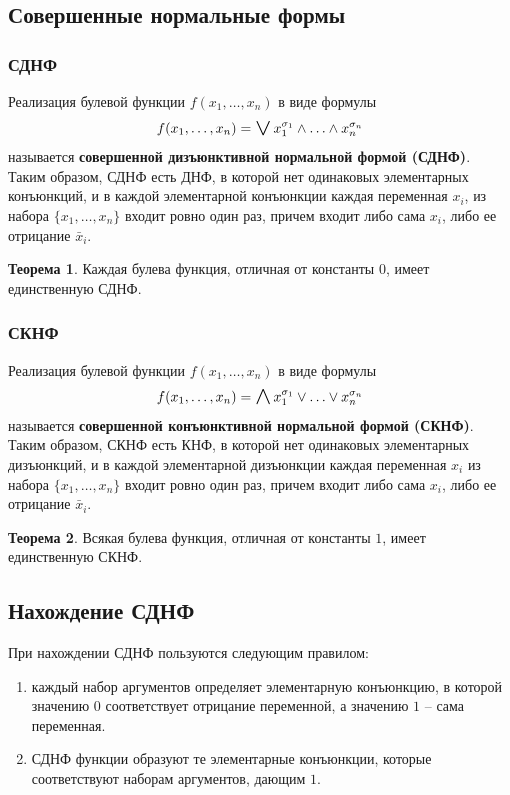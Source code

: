 \documentclass[a5paper, 11pt]{extarticle}
\theoremstyle{definition}
\newtheorem*{theorem*}{Теорема}
\theoremstyle{definition}
\theoremstyle{definition}
\numberwithin{figure}{section}
\numberwithin{table}{section}
\DeclareMathOperator{\biglor}{\mathrel{\raisebox{-.4ex}{$\mathlarger{\mathlarger{\mathlarger{\mathlarger{\lor}}}}$}}}
\DeclareMathOperator{\bigland}{\mathrel{\raisebox{-.4ex}{$\mathlarger{\mathlarger{\mathlarger{\mathlarger{\land}}}}$}}}
\begin{document}
\subsection{Совершенные нормальные формы}

\subsubsection{СДНФ}

Реализация булевой функции \(f(x_1, \ldots, x_n)\) в виде формулы
\[
    f(x_1, \ldots, x_n) = \biglor x_1^{\sigma_1} \land \ldots \land x_n^{\sigma_n}
\]
называется \textbf{совершенной дизъюнктивной нормальной формой (СДНФ)}. Таким образом, СДНФ есть ДНФ, в которой нет одинаковых элементарных конъюнкций, и в каждой элементарной конъюнкции каждая переменная \(x_i\), из набора \(\{x_1, \ldots, x_n\}\) входит ровно один раз, причем входит либо сама \(x_i\), либо ее отрицание \(\bar{x}_i\).

\begin{theorem*}
    Каждая булева функция, отличная от константы \(0\), имеет единственную СДНФ.
\end{theorem*}

\subsubsection{СКНФ}

Реализация булевой функции \(f(x_1, \ldots, x_n)\) в виде формулы
\[
    f(x_1, \ldots, x_n) = \bigland x_1^{\sigma_1} \lor \ldots \lor x_n^{\sigma_n}
\]
называется \textbf{совершенной конъюнктивной нормальной формой (СКНФ)}. Таким образом, СКНФ есть КНФ, в которой нет одинаковых элементарных дизъюнкций, и в каждой элементарной дизъюнкции каждая переменная \(x_i\) из набора \(\{x_1, \ldots, x_n\}\) входит ровно один раз, причем входит либо сама \(x_i\), либо ее отрицание \(\bar{x}_i\).

\begin{theorem*}
    Всякая булева функция, отличная от константы \(1\), имеет единственную СКНФ.
\end{theorem*}

\subsection{Нахождение СДНФ}

\noindent При нахождении СДНФ пользуются следующим правилом:
\begin{enumerate}
    \item каждый набор аргументов определяет элементарную конъюнкцию, в которой значению \(0\) соответствует отрицание переменной, а значению \(1\) -- сама переменная.
    \item СДНФ функции образуют те элементарные конъюнкции, которые соответствуют наборам аргументов, дающим \(1\).
\end{enumerate}
\end{document}
